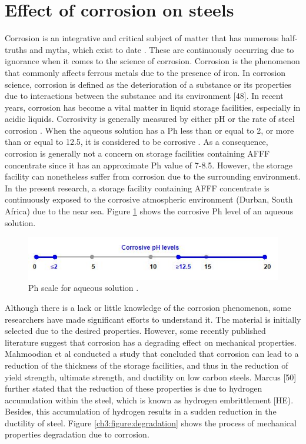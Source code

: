 \documentclass[12pt]{report}
\begin{document}
\section{Effect of corrosion on steels}
Corrosion is an integrative and critical subject of matter that has numerous half-truths and myths, which exist to date \cite{mcarthur2004engineering}. These are continuously occurring due to ignorance when it comes to the science of corrosion.  Corrosion is the phenomenon that commonly affects ferrous metals due to the presence of iron. In corrosion science, corrosion is defined as the deterioration of a substance or its properties due to interactions between the substance and its environment [48].
In recent years, corrosion has become a vital matter in liquid storage facilities, especially in acidic liquids. Corrosivity is generally measured by either pH or the rate of steel corrosion \cite{marzorati2018green}. When the aqueous solution has a Ph less than or equal to 2, or more than or equal to 12.5, it is considered to be corrosive \cite{marzorati2018green}. As a consequence, corrosion is generally not a concern on storage facilities containing AFFF concentrate since it has an approximate Ph value of 7-8.5. However, the storage facility can nonetheless suffer from corrosion due to the surrounding environment. In the present research, a storage facility containing AFFF concentrate is continuously exposed to the corrosive atmospheric environment (Durban, South Africa) due to the near sea. Figure \ref{ch3:figure:ph} shows the corrosive Ph level of an aqueous solution. 
 
\begin{figure}[H]
    \centering
    \includegraphics[width=.8\textwidth]{aqueous_solution_ph_scale.jpg}
    \caption{Ph scale for aqueous solution \cite{marzorati2018green}.}
    \label{ch3:figure:ph}
\end{figure}

Although there is a lack or little knowledge of the corrosion phenomenon, some researchers have made significant efforts to understand it. The material is initially selected due to the desired properties. However, some recently published literature suggest that corrosion has a degrading effect on mechanical properties. Mahmoodian et al \cite{li2018effect} conducted a study that concluded that corrosion can lead to a reduction of the thickness of the storage facilities, and thus in the reduction of yield strength, ultimate strength, and ductility on low carbon steels.  Marcus [50] further stated that the reduction of these properties is due to hydrogen accumulation within the steel, which is known as hydrogen embrittlement [HE). Besides, this accumulation of hydrogen results in a sudden reduction in the ductility of steel. Figure \ref{ch3:figure:degradation} shows the process of mechanical properties degradation due to corrosion.
 
\end{document}
